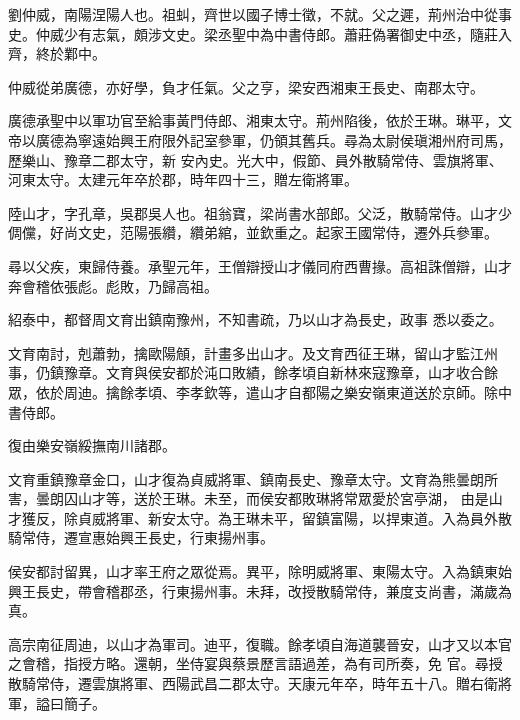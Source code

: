 \begin{pinyinscope}
 劉仲威，南陽涅陽人也。祖虯，齊世以國子博士徵，不就。父之遲，荊州治中從事史。仲威少有志氣，頗涉文史。梁丞聖中為中書侍郎。蕭莊偽署御史中丞，隨莊入齊，終於鄴中。



 仲威從弟廣德，亦好學，負才任氣。父之亨，梁安西湘東王長史、南郡太守。



 廣德承聖中以軍功官至給事黃門侍郎、湘東太守。荊州陷後，依於王琳。琳平，文帝以廣德為寧遠始興王府限外記室參軍，仍領其舊兵。尋為太尉侯瑱湘州府司馬，歷樂山、豫章二郡太守，新
 安內史。光大中，假節、員外散騎常侍、雲旗將軍、河東太守。太建元年卒於郡，時年四十三，贈左衛將軍。



 陸山才，字孔章，吳郡吳人也。祖翁寶，梁尚書水部郎。父泛，散騎常侍。山才少倜儻，好尚文史，范陽張纘，纘弟綰，並欽重之。起家王國常侍，遷外兵參軍。



 尋以父疾，東歸侍養。承聖元年，王僧辯授山才儀同府西曹掾。高祖誅僧辯，山才奔會稽依張彪。彪敗，乃歸高祖。



 紹泰中，都督周文育出鎮南豫州，不知書疏，乃以山才為長史，政事
 悉以委之。



 文育南討，剋蕭勃，擒歐陽頠，計畫多出山才。及文育西征王琳，留山才監江州事，仍鎮豫章。文育與侯安都於沌口敗績，餘孝頃自新林來寇豫章，山才收合餘眾，依於周迪。擒餘孝頃、李孝欽等，遣山才自都陽之樂安嶺東道送於京師。除中書侍郎。



 復由樂安嶺綏撫南川諸郡。



 文育重鎮豫章金口，山才復為貞威將軍、鎮南長史、豫章太守。文育為熊曇朗所害，曇朗囚山才等，送於王琳。未至，而侯安都敗琳將常眾愛於宮亭湖，
 由是山才獲反，除貞威將軍、新安太守。為王琳未平，留鎮富陽，以捍東道。入為員外散騎常侍，遷宣惠始興王長史，行東揚州事。



 侯安都討留異，山才率王府之眾從焉。異平，除明威將軍、東陽太守。入為鎮東始興王長史，帶會稽郡丞，行東揚州事。未拜，改授散騎常侍，兼度支尚書，滿歲為真。



 高宗南征周迪，以山才為軍司。迪平，復職。餘孝頃自海道襲晉安，山才又以本官之會稽，指授方略。還朝，坐侍宴與蔡景歷言語過差，為有司所奏，免
 官。尋授散騎常侍，遷雲旗將軍、西陽武昌二郡太守。天康元年卒，時年五十八。贈右衛將軍，謚曰簡子。




\end{pinyinscope}
